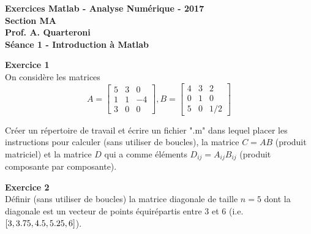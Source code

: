 \begin{center}
  \textbf{Exercices Matlab - Analyse Numérique - 2017 \\
  Section MA \\
  Prof. A. Quarteroni \\
  Séance 1 - Introduction à Matlab}
\end{center}


\vspace{10mm}

\textbf{Exercice 1 \\}
On considère les matrices
\begin{equation*}
  A = \begin{bmatrix}
        5 & 3 & 0  \\
        1 & 1 & -4 \\
        3 & 0 & 0
      \end{bmatrix}
  ,
  B = \begin{bmatrix}
        4 & 3 & 2  \\
        0 & 1 & 0  \\
        5 & 0 & 1/2
      \end{bmatrix}
\end{equation*}

Créer un répertoire de travail et écrire un fichier ".m" dans lequel placer les instructions pour calculer (sans utiliser de boucles), la matrice $C = AB$ (produit matriciel) et la matrice $D$ qui a comme éléments $D_{ij} = A_{ij} B_{ij}$ (produit composante par composante).








\textbf{Exercice 2 \\}
Définir (sans utiliser de boucles) la matrice diagonale de taille $n = 5$ dont la diagonale est un vecteur de points équirépartis entre $3$ et $6$ (i.e. $\squared{3, 3.75, 4.5, 5.25, 6}$).
